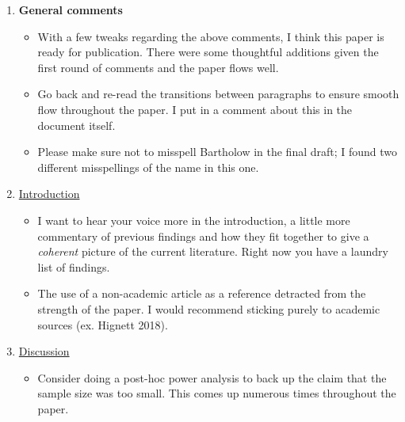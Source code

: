 \documentclass[authordate, serif, review]{jote-article}
\begin{document}
\begin{multicols}{2}
\newpage
\begin{reviewend}{}
    \begin{enumerate}[label=\textbf{\arabic*}), start=0]
        \item \textbf{General comments}
            \begin{itemize}
                \item With a few tweaks regarding the above comments, I think this paper is ready for publication. There were some thoughtful additions given the first round of comments and the paper flows well.
                \item Go back and re-read the transitions between paragraphs to ensure smooth flow throughout the paper. I put in a comment about this in the document itself.
                \item Please make sure not to misspell Bartholow in the final draft; I found two different misspellings of the name in this one.
            \end{itemize}
        \item \hyperref[sec:introduction]{Introduction}
            \begin{itemize}
                \item I want to hear your voice more in the introduction, a little more commentary of previous findings and how they fit together to give a \textit{coherent} picture of the current literature. Right now you have a laundry list of findings.
                \item The use of a non-academic article as a reference detracted from the strength of the paper. I would recommend sticking purely to academic sources (ex. Hignett 2018).
            \end{itemize}
            
        \item \hyperref[sec:discussion]{Discussion}
            \begin{itemize}
                \item Consider doing a post-hoc power analysis to back up the claim that the sample size was too small. This comes up numerous times throughout the paper.
            \end{itemize}
            

\end{enumerate}
\end{reviewend}
\end{multicols}
\end{document}
